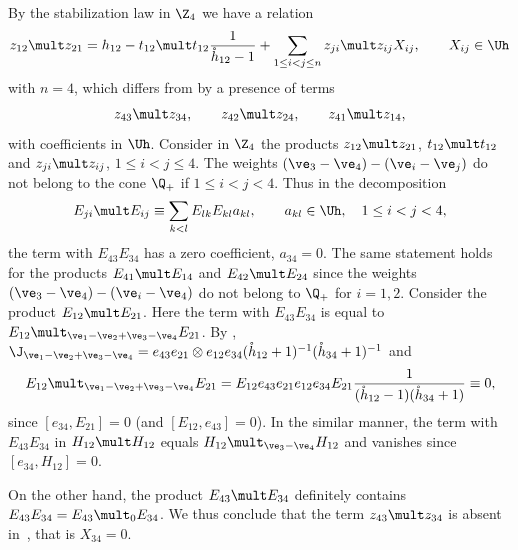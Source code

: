 \documentclass[pdftex]{sigma}
\def\nplus{\mathfrak{n}}\def\nn{\nonumber}\def\nin{\noindent}
\def\s{z}\def\S{\mathrm {S}}\def\si{\sigma}\def\Sp{\S^{\nplus}}\def\sy{\acute{\sigma}}\def\th{\mathring{h}}
\numberwithin{equation}{section}
\begin{document}
By the stabilization law in $\Z_4$ we have a relation
\begin{gather} \label{proof23}
\s_{12}\mult \s_{21}= h_{12}-t_{12}\mult t_{12}  \frac{1}{\th_{12}-1}
+\sum_{1\leq i<j\leq n}\s_{ji}\mult\s_{ij}X_{ij} ,\qquad X_{ij}\in\Uh
\end{gather}
with $n=4$, which dif\/fers from  by a presence of terms
\begin{gather*}\s_{43}\mult\s_{34} ,\qquad \s_{42}\mult\s_{24} ,\qquad \s_{41}\mult\s_{14} ,
\end{gather*}
with coef\/f\/icients in $\Uh$. Consider in $\Z_4$ the products  $\s_{12}\mult\s_{21}$, $t_{12}\mult t_{12}$
and $\s_{ji}\mult\s_{ij}$, $1\leq i<j\leq 4$. The weights $(\ve_3-\ve_4)-(\ve_i-\ve_j)$ do not belong
to the cone $\Q_+$ if $1\leq i<j<4$. Thus in the decomposition
\begin{gather*}
E_{ji}\mult E_{ij}\equiv \sum_{k<l}E_{lk}E_{kl}a_{kl} ,\qquad a_{kl}\in\Uh ,\quad 1\leq i<j<4 ,
\end{gather*}
the term with $E_{43}E_{34}$ has a zero coef\/f\/icient, $a_{34}=0$. The same statement holds for the products
$E_{41}\mult E_{14}$ and $E_{42}\mult E_{24}$ since the weights $(\ve_3-\ve_4)-(\ve_i-\ve_4)$ do
not belong to $\Q_+$ for $i=1,2$. Consider the product $E_{12}\mult E_{21}$. Here the term with
$E_{43}E_{34}$ is equal to $E_{12}\mult_{\ve_1-\ve_2+\ve_3-\ve_4}E_{21}$. By ,
$\J_{\ve_1-\ve_2+\ve_3-\ve_4}=e_{43}e_{21}\otimes e_{12}e_{34}(\th_{12}+1)^{-1}(\th_{34}+1)^{-1}$ and
\begin{gather*}E_{12}\mult_{\ve_1-\ve_2+\ve_3-\ve_4}E_{21}=
E_{12}e_{43}e_{21}e_{12}e_{34}E_{21} \frac{1}{(\th_{12}-1)(\th_{34}+1)}\equiv 0,\end{gather*}
since $[e_{34},E_{21}]=0$ (and $[E_{12},e_{43}]=0$). In the similar manner, the term with
$E_{43}E_{34}$ in $H_{12}\mult H_{12}$ equals $H_{12}\mult_{\ve_3-\ve_4}H_{12}$ and vanishes
since $[e_{34},H_{12}]=0$.

On the other hand, the product $E_{43}\mult E_{34}$
def\/initely contains $E_{43}E_{34}=E_{43}\mult_0 E_{34}$. We thus conclude that the term
$\s_{43}\mult \s_{34}$ is absent in~, that is $X_{34}=0$.
\end{document}
